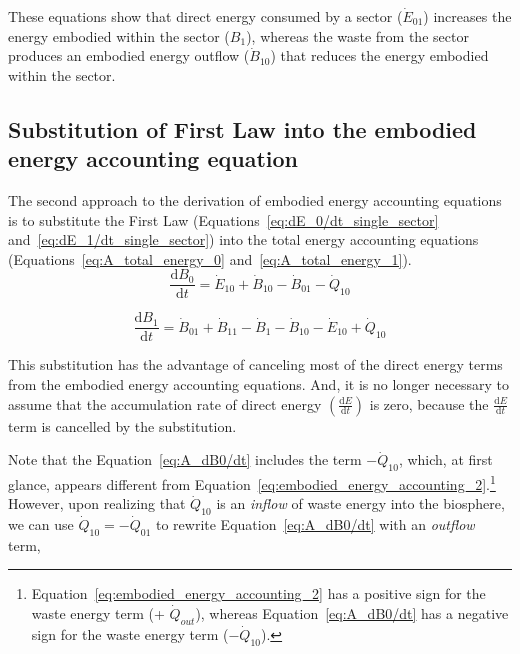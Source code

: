 These equations show that direct energy consumed by a 
sector ($\dot{E}_{01}$) increases the energy embodied within the sector ($B_1$), 
whereas the waste from the sector produces an embodied
energy outflow ($\dot{B}_{10}$) that reduces 
the energy embodied within the sector. 


\subsection{Substitution of First Law into the embodied energy accounting equation} %
\label{subsec:A_first_law_embodied}

The second approach to the derivation of embodied energy
accounting equations is to substitute the First Law
(Equations~\ref{eq:dE_0/dt_single_sector} and~\ref{eq:dE_1/dt_single_sector}) 
into the total energy accounting equations 
(Equations~\ref{eq:A_total_energy_0} and~\ref{eq:A_total_energy_1}). 
\begin{equation} \label{eq:A_dB0/dt}
	\frac{\mathrm{d}B_{0}}{\mathrm{d}t} 
	= \dot{E}_{10}
	+ \dot{B}_{10} 
	- \dot{B}_{01}
	- \dot{Q}_{10}
\end{equation}

\begin{equation} \label{eq:A_dB1/dt}
	\frac{\mathrm{d}B_{1}}{\mathrm{d}t} 
	= \dot{B}_{01} 
	+ \dot{B}_{11}
	- \dot{B}_{1}
	- \dot{B}_{10}
	- \dot{E}_{10}
	+ \dot{Q}_{10}
\end{equation}

This substitution has the advantage of canceling most 
of the direct energy terms from the embodied energy accounting equations.
And, it is no longer necessary to assume that the 
accumulation rate of direct energy 
$\left( \frac{\mathrm{d}E}{\mathrm{d}t} \right)$
is zero, because the 
$\frac{\mathrm{d}E}{\mathrm{d}t}$
term is cancelled by the substitution.

Note that the Equation~\ref{eq:A_dB0/dt} includes the
term $-\dot{Q}_{10}$, which, at first glance,
appears different from 
Equation~\ref{eq:embodied_energy_accounting_2}.\footnote{Equation~\ref{eq:embodied_energy_accounting_2}
has a positive sign for the waste energy term (+ $\dot{Q}_{out}$),
whereas Equation~\ref{eq:A_dB0/dt} has a 
negative sign for the waste energy term ($- \dot{Q}_{10}$).}
However, upon realizing that $\dot{Q}_{10}$ is an \emph{inflow}
of waste energy into the biosphere, we can use $\dot{Q}_{10} = - \dot{Q}_{01}$
to rewrite Equation~\ref{eq:A_dB0/dt} with an \emph{outflow} 
term,

